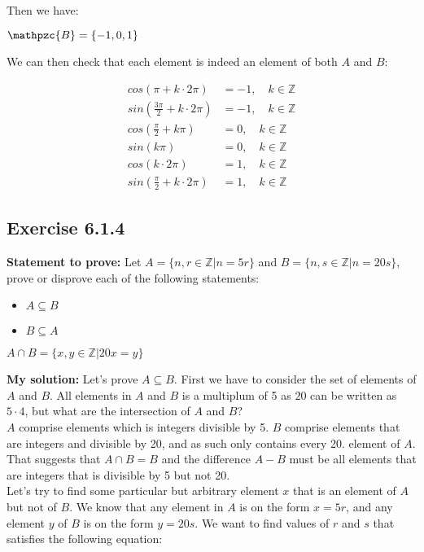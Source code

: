 \documentclass{article}
\newcommand{\cent}[1]{\begin{center}#1\end{center}}
\newcommand{\mAlign}[1]{\begin{align*}#1\end{align*}}
\newcommand{\doubleZ}{\mathbb{Z}}
\newcommand{\In}{\! \in \!}
\newcommand{\script}[1]{\mathpzc{#1}}
\newcommand{\Prove}{\textbf{Statement to prove: }}
\newcommand{\Solution}{\textbf{My solution: }}
\newcommand{\QED}{\boxed{}}
\newcommand{\Exercise}[1]{\subsection{Exercise #1}}
\begin{document}
\begin{enumerate}[label = \textbf{a.}]
		Then we have:
		
		\cent{$\script{B} = \{-1,0,1\}$}
		
		We can then check that each element is indeed an element of both $A$ and $B$:
		
		\mAlign{cos(\pi + k \cdot 2\pi) &= -1, \quad k \In \doubleZ\\
						sin(\frac{3\pi}{2} + k \cdot 2\pi) &= -1,  \quad k \In \doubleZ\\
						cos(\frac{\pi}{2} + k \pi) &= 0, \quad k \In \doubleZ\\
						sin(k\pi) &= 0, \quad k \In \doubleZ\\
						cos(k \cdot 2 \pi) &= 1,\quad k \In \doubleZ\\
						sin(\frac{\pi}{2} + k \cdot 2 \pi) &= 1,\quad k \In \doubleZ}
					
		\QED
	\end{enumerate}	
	
	\Exercise{6.1.4} 
		
	\Prove
	Let $A = \{n,r \In \doubleZ | n = 5r\}$ and $B = \{n,s \In \doubleZ | n = 20s\}$, prove or disprove each of the following statements:
	\begin{itemize}
		\item $A \subseteq B$
		\item $B \subseteq A$
	\end{itemize}

	\cent{$A \cap B = \{x,y \In \doubleZ | 20x = y\}$}
	
	\Solution
	Let's prove $A \subseteq B$. First we have to consider the set of elements of $A$ and $B$. All elements in $A$ and $B$ is a multiplum of 5 as $20$ can be written as $5 \cdot 4$, but what are the intersection of $A$ and $B$?\\
	
	$A$ comprise elements which is integers divisible by 5. $B$ comprise elements that are integers and  divisible by 20, and as such only contains every 20. element of $A$. That suggests that  $A \cap B = B$ and the difference $A - B$ must be all elements that are integers that is divisible by 5 but not 20.\\
	
	Let's try to find some particular but arbitrary element $x$ that is an element of $A$ but not of $B$. We know that any element in $A$ is on the form $x = 5r$, and any element $y$ of $B$ is on the form $y = 20s $. We want to find values of $r$ and $s$ that satisfies the following equation:
	
\end{document}
